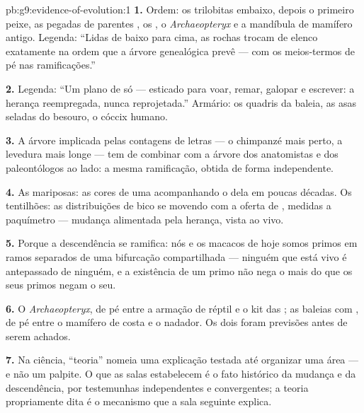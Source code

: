 \begin{solution}{pb:g9:evidence-of-evolution:1}
\textbf{1.} Ordem: os trilobitas embaixo, depois o primeiro
peixe, as pegadas de parentes , os , o
\emph{Archaeopteryx} e a mandíbula de mamífero antigo.
Legenda: ``Lidas de baixo para cima, as rochas trocam de
elenco exatamente na ordem que a árvore genealógica prevê ---
com os meios-termos de pé nas ramificações.''

\textbf{2.} Legenda: ``Um plano de  só --- esticado para
voar, remar, galopar e escrever: a herança reempregada, nunca
reprojetada.'' Armário: os quadris da baleia, as asas seladas
do besouro, o cóccix humano.

\textbf{3.} A árvore implicada pelas contagens de letras ---
o chimpanzé mais perto, a levedura mais longe --- tem de
combinar com a árvore dos anatomistas e dos paleontólogos ao
lado: a mesma ramificação, obtida de forma independente.

\textbf{4.} As mariposas: as cores de uma 
acompanhando o  dela em poucas décadas. Os
tentilhões: as distribuições de bico se movendo com a oferta
de , medidas a paquímetro --- mudança alimentada pela
herança, vista ao vivo.

\textbf{5.} Porque a descendência se ramifica: nós e os
macacos de hoje somos primos em ramos separados de uma
bifurcação compartilhada --- ninguém que está vivo é
antepassado de ninguém, e a existência de um primo não nega o
 mais do que os seus primos negam o seu.

\textbf{6.} O \emph{Archaeopteryx}, de pé entre a armação de
réptil e o kit das ; as baleias  com , de pé
entre o mamífero de costa e o nadador. Os dois foram
previsões antes de serem achados.

\textbf{7.} Na ciência, ``teoria'' nomeia uma explicação
testada até organizar uma área --- e não um palpite. O que as
salas estabelecem é o fato histórico da mudança e da
descendência, por testemunhas independentes e convergentes; a
teoria propriamente dita é o mecanismo que a sala seguinte
explica.


\end{solution}

